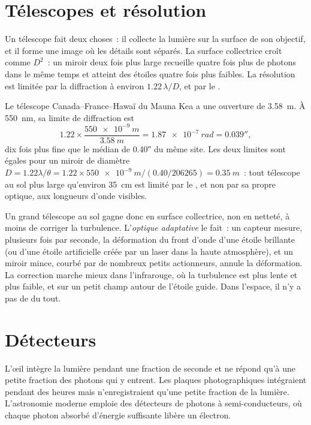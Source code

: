 \section{Télescopes et résolution}

Un télescope fait deux choses~: il collecte la lumière sur la surface de son
objectif, et il forme une image où les détails sont séparés. La surface
collectrice croît comme $D^2$~: un miroir deux fois plus large recueille
quatre fois plus de photons dans le même temps et atteint des étoiles quatre
fois plus faibles. La résolution est limitée par la diffraction à environ
$1.22\,\lambda/D$, et par le .

\begin{example}
Le télescope Canada--France--Hawaï du Mauna Kea a une ouverture de
\qty{3.58}{m}. À \qty{550}{nm}, sa limite de diffraction est
\[
  1.22\times\frac{\qty{550e-9}{m}}{\qty{3.58}{m}} = \qty{1.87e-7}{rad}
  = \ang{;;0.039},
\]
dix fois plus fine que le  médian de \ang{;;0.40} du même site. Les
deux limites sont égales pour un miroir de diamètre $D = 1.22\lambda/\theta =
1.22\times\qty{550e-9}{m}/(\num{0.40}/\num{206265}) = \qty{0.35}{m}$~: tout
télescope au sol plus large qu'environ \qty{35}{cm} est limité par le ,
et non par sa propre optique, aux longueurs d'onde visibles.
\end{example}

Un grand télescope au sol gagne donc en surface collectrice, non en netteté, à
moins de corriger la turbulence. L'\emph{optique adaptative} le fait~: un
capteur mesure, plusieurs fois par seconde, la déformation du front d'onde d'une
étoile brillante (ou d'une étoile artificielle créée par un laser dans la haute
atmosphère), et un miroir mince, courbé par de nombreux petits actionneurs,
annule la déformation. La correction marche mieux dans
l'infrarouge, où la turbulence est plus lente et plus faible, et sur un petit
champ autour de l'étoile guide. Dans l'espace, il n'y a pas de  du tout.

\section{Détecteurs}

L'œil intègre la lumière pendant une fraction de seconde et ne répond qu'à une
petite fraction des photons qui y entrent. Les plaques photographiques
intégraient pendant des heures mais n'enregistraient qu'une petite fraction de
la lumière. L'astronomie moderne emploie des détecteurs de photons à
semi-conducteurs, où chaque photon absorbé d'énergie suffisante libère un
électron.

